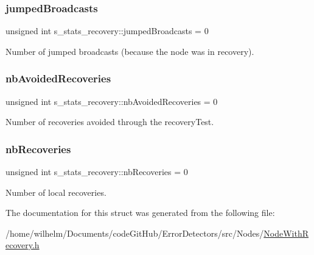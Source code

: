 \subsubsection{\texorpdfstring{jumped\+Broadcasts}{jumpedBroadcasts}}
{\footnotesize\ttfamily unsigned int s\+\_\+stats\+\_\+recovery\+::jumped\+Broadcasts = 0}



Number of jumped broadcasts (because the node was in recovery). 

\mbox{\label{structs__stats__recovery_a0f21481940b624e49b0880d1bbf3df33}} 
\subsubsection{\texorpdfstring{nb\+Avoided\+Recoveries}{nbAvoidedRecoveries}}
{\footnotesize\ttfamily unsigned int s\+\_\+stats\+\_\+recovery\+::nb\+Avoided\+Recoveries = 0}



Number of recoveries avoided through the recovery\+Test. 

\mbox{\label{structs__stats__recovery_a89b2e116cf913c2939d186a2cd4f865b}} 
\subsubsection{\texorpdfstring{nb\+Recoveries}{nbRecoveries}}
{\footnotesize\ttfamily unsigned int s\+\_\+stats\+\_\+recovery\+::nb\+Recoveries = 0}



Number of local recoveries. 



The documentation for this struct was generated from the following file\+:\begin{DoxyCompactItemize}
\item 
/home/wilhelm/\+Documents/code\+Git\+Hub/\+Error\+Detectors/src/\+Nodes/\hyperlink{_node_with_recovery_8h}{Node\+With\+Recovery.\+h}\end{DoxyCompactItemize}
